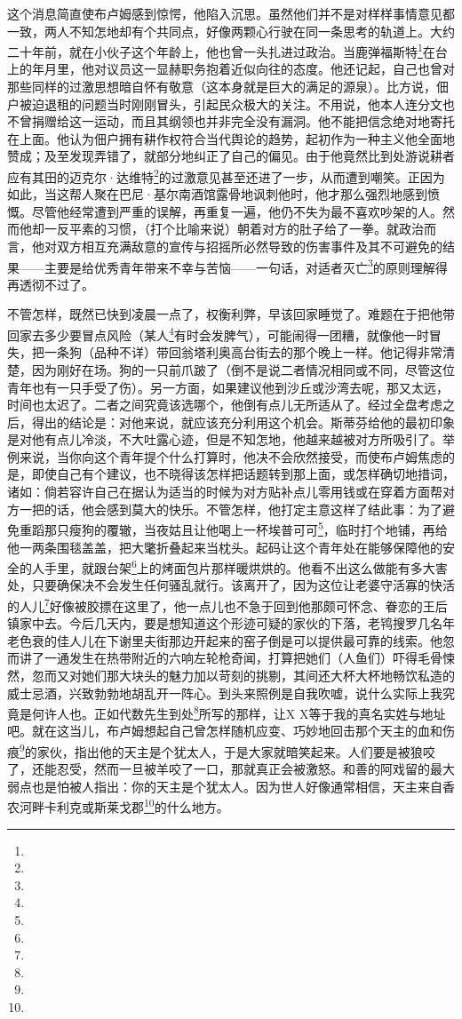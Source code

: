 \par 这个消息简直使布卢姆感到惊愕，他陷入沉思。虽然他们并不是对样样事情意见都一致，两人不知怎地却有个共同点，好像两颗心行驶在同一条思考的轨道上。大约二十年前，就在小伙子这个年龄上，他也曾一头扎进过政治。当鹿弹福斯特\footnote{}在台上的年月里，他对议员这一显赫职务抱着近似向往的态度。他还记起，自己也曾对那些同样的过激思想暗自怀有敬意（这本身就是巨大的满足的源泉）。比方说，佃户被迫退租的问题当时刚刚冒头，引起民众极大的关注。不用说，他本人连分文也不曾捐赠给这一运动，而且其纲领也并非完全没有漏洞。他不能把信念绝对地寄托在上面。他认为佃户拥有耕作权符合当代舆论的趋势，起初作为一种主义他全面地赞成；及至发现弄错了，就部分地纠正了自己的偏见。由于他竟然比到处游说耕者应有其田的迈克尔·达维特\footnote{}的过激意见甚至还进了一步，从而遭到嘲笑。正因为如此，当这帮人聚在巴尼·基尔南酒馆露骨地讽刺他时，他才那么强烈地感到愤慨。尽管他经常遭到严重的误解，再重复一遍，他仍不失为最不喜欢吵架的人。然而他却一反平素的习惯，（打个比喻来说）朝着对方的肚子给了一拳。就政治而言，他对双方相互充满敌意的宣传与招摇所必然导致的伤害事件及其不可避免的结果——主要是给优秀青年带来不幸与苦恼——一句话，对适者灭亡\footnote{}的原则理解得再透彻不过了。
\par 不管怎样，既然已快到凌晨一点了，权衡利弊，早该回家睡觉了。难题在于把他带回家去多少要冒点风险（某人\footnote{}有时会发脾气），可能闹得一团糟，就像他一时冒失，把一条狗（品种不详）带回翁塔利奥高台街去的那个晚上一样。他记得非常清楚，因为刚好在场。狗的一只前爪跛了（倒不是说二者情况相同或不同，尽管这位青年也有一只手受了伤）。另一方面，如果建议他到沙丘或沙湾去呢，那又太远，时间也太迟了。二者之间究竟该选哪个，他倒有点儿无所适从了。经过全盘考虑之后，得出的结论是：对他来说，就应该充分利用这个机会。斯蒂芬给他的最初印象是对他有点儿冷淡，不大吐露心迹，但是不知怎地，他越来越被对方所吸引了。举例来说，当你向这个青年提个什么打算时，他决不会欣然接受，而使布卢姆焦虑的是，即使自己有个建议，也不晓得该怎样把话题转到那上面，或怎样确切地措词，诸如：倘若容许自己在据认为适当的时候为对方贴补点儿零用钱或在穿着方面帮对方一把的话，他会感到莫大的快乐。不管怎样，他打定主意这样了结此事：为了避免重蹈那只瘦狗的覆辙，当夜姑且让他喝上一杯埃普可可\footnote{}，临时打个地铺，再给他一两条围毯盖盖，把大氅折叠起来当枕头。起码让这个青年处在能够保障他的安全的人手里，就跟台架\footnote{}上的烤面包片那样暖烘烘的。他看不出这么做能有多大害处，只要确保决不会发生任何骚乱就行。该离开了，因为这位让老婆守活寡的快活的人儿\footnote{}好像被胶摽在这里了，他一点儿也不急于回到他那颇可怀念、眷恋的王后镇家中去。今后几天内，要是想知道这个形迹可疑的家伙的下落，老鸨搜罗几名年老色衰的佳人儿在下谢里夫街那边开起来的窑子倒是可以提供最可靠的线索。他忽而讲了一通发生在热带附近的六响左轮枪奇闻，打算把她们（人鱼们）吓得毛骨悚然，忽而又对她们那大块头的魅力加以苛刻的挑剔，其间还大杯大杯地畅饮私造的威士忌酒，兴致勃勃地胡乱开一阵心。到头来照例是自我吹嘘，说什么实际上我究竟是何许人也。正如代数先生到处\footnote{}所写的那样，让X X等于我的真名实姓与地址吧。就在这当儿，布卢姆想起自己曾怎样随机应变、巧妙地回击那个天主的血和伤痕\footnote{}的家伙，指出他的天主是个犹太人，于是大家就暗笑起来。人们要是被狼咬了，还能忍受，然而一旦被羊咬了一口，那就真正会被激怒。和善的阿戏留的最大弱点也是怕被人指出：你的天主是个犹太人。因为世人好像通常相信，天主来自香农河畔卡利克或斯莱戈郡\footnote{}的什么地方。
